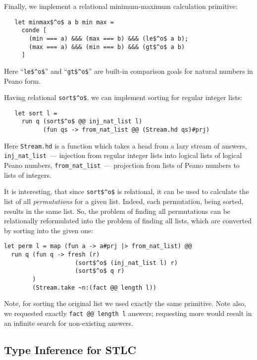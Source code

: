 Finally, we implement a relational minimum-maximum calculation
primitive:

\begin{lstlisting}
   let minmax$^o$ a b min max =
     conde [
       (min === a) &&& (max === b) &&& (le$^o$ a b);
       (max === a) &&& (min === b) &&& (gt$^o$ a b)
     ]
\end{lstlisting}

Here ``\lstinline{le$^o$}'' and ``\lstinline{gt$^o$}'' are built-in comparison goals for natural numbers in Peano form.

Having relational \lstinline{sort$^o$}, we can implement sorting for regular integer lists:

\begin{lstlisting}
   let sort l =
     run q (sort$^o$ @@ inj_nat_list l)
           (fun qs -> from_nat_list @@ (Stream.hd qs)#prj)
\end{lstlisting}

Here \lstinline{Stream.hd} is a function which takes a head from a lazy stream of answers,
\lstinline{inj_nat_list}~--- injection from regular integer lists into logical lists of logical Peano numbers,
\lstinline{from_nat_list}~--- projection from lists of Peano numbers to lists of integers.

It is interesting, that since \lstinline{sort$^o$} is
relational, it can be used to calculate the list of all \emph{permutations}
for a given list. Indeed, each permutation, being sorted, results in the same list.
So, the problem of finding all permutations can be relationally reformulated into
the problem of finding all lists, which are converted by sorting into the given one:

\begin{lstlisting}
let perm l = map (fun a -> a#prj |> from_nat_list) @@
  run q (fun q -> fresh (r)
                    (sort$^o$ (inj_nat_list l) r)
                    (sort$^o$ q r)
        )
        (Stream.take ~n:(fact @@ length l))
\end{lstlisting}

Note, for sorting the original list we used exactly the same primitive. Note also,
we requested exactly \lstinline{fact @@ length l} answers; requesting more
would result in an infinite search for non-existing answers.

\subsection{Type Inference for STLC}

